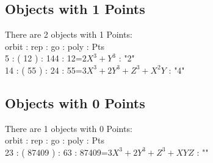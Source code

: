 \documentclass[12pt]{article}
\begin{document}
{\subsection*{Objects with 1 Points}
There are 2 objects with 1 Points: \\
orbit : rep : go : poly : Pts\\
5 : ( 12 ) : 144 : 12=$2X^3 + Y^3$ : "2"\\
14 : ( 55 ) : 24 : 55=$3X^3 + 2Y^3 + Z^3 + X^2Y$ : "4"\\
\subsection*{Objects with 0 Points}
There are 1 objects with 0 Points: \\
orbit : rep : go : poly : Pts\\
23 : ( 87409 ) : 63 : 87409=$3X^3 + 2Y^3 + Z^3 + XYZ$ : ""\\


%


%


}%
\end{document}
